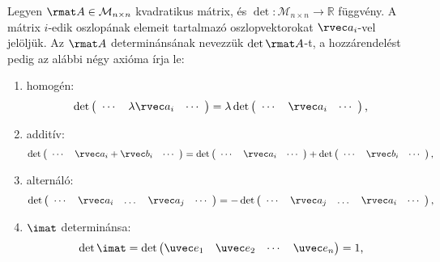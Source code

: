 \documentclass[a4paper, 12pt]{scrartcl}
\begin{document}


\begin{definition}[Determináns]
  \newcommand\noskp{\vspace{-3mm}}
  \newcommand{\edet}[1]{\det \begin{pmatrix} \phantom{i}\cdots & #1 & \cdots\phantom{i} \end{pmatrix}}
  Legyen $\rmat A \in \mathcal M_{n \times n}$ kvadratikus mátrix, és
  $\det: \mathcal M_{n \times n} \rightarrow \mathbb R$ függvény. A mátrix
  $i$-edik oszlopának elemeit tartalmazó oszlopvektorokat $\rvec a_i$-vel
  jelöljük. Az $\rmat A$ determinánsának nevezzük $\det \rmat A$-t, a
  hozzárendelést pedig az alábbi négy axióma írja le:
  \begin{enumerate}
    \item homogén:
          $$
            \edet{\lambda \rvec a_i} = \lambda \edet{\rvec a_i}
            \text,
          $$
    \item \noskp additív:\noskp
          $$
            \edet{\rvec a_i + \rvec b_i} =
            \edet{\rvec a_i} + \edet{\rvec b_i}
            \text,
          $$
    \item \noskp alternáló:\noskp
          $$
            \edet{\rvec a_i & \dots & \rvec a_j} =
            - \edet{\rvec a_j & \dots & \rvec a_i}
            \text,
          $$
    \item \noskp $\imat$ determinánsa:
          $$
            \det \imat =\det \begin{pmatrix}
              \uvec e_1 & \uvec e_2 & \cdots & \uvec e_n
            \end{pmatrix} = 1
            \text,
          $$
  \end{enumerate}
\end{definition}
\end{document}
